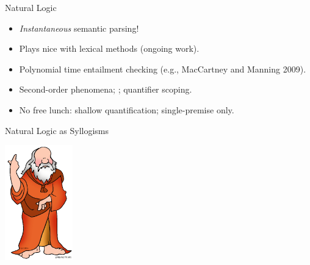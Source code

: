 \begin{frame}{Natural Logic}
\begin{center}
\end{center}
\vspace{1em}
\pause

\begin{itemize}
\item \textit{Instantaneous} semantic parsing!
\item Plays nice with lexical methods (ongoing work).
\end{itemize}
\vspace{1ex}
\pause

\begin{itemize}
\item Polynomial time entailment checking (e.g., MacCartney and Manning 2009).
\end{itemize}
\vspace{1ex}
\pause

\begin{itemize}
\item Second-order phenomena; ; quantifier scoping.
\pause
\item No free lunch: shallow quantification; single-premise only.
\end{itemize}

\end{frame}

\def\title{Natural Logic as Syllogisms}
\begin{frame}{\title}
\begin{center}
  \includegraphics[height=5cm]{../img/aristotle.png}
\end{center}
\end{frame}

